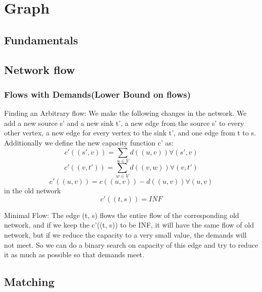 \chapter{Graph}


\section{Fundamentals}

\section{Network flow}
	\subsection{Flows with Demands(Lower Bound on flows)}
		Finding an Arbitrary flow:
		We make the following changes in the network. We add a new source s' and 
		a new sink	t', a new edge from the source s' to every other vertex, a 
		new edge for every vertex to the sink t', and one edge from t to s. 
		Additionally we define the new capacity function c' as:
		$$c'((s', v)) = \sum_{u\in V} d((u, v)) \forall (s', v)$$
		$$c'((v, t')) = \sum_{w\in V} d((v, w)) \forall (v, t')$$
		$$c'((u, v)) = c((u, v)) - d((u, v)) \forall (u, v)$$ in the old network
		$$c'((t, s)) = INF$$

		Minimal Flow:
		The edge (t, s) flows the entire flow of the corresponding old network, and
		if we keep the c'((t, s)) to be INF, it will have the same flow of old network,
		but if we reduce the capacity to a very small value, the demands will not meet.
		So we can do a binary search on capacity of this edge and try to reduce it as much
		as possible so that demands meet.


\section{Matching}

